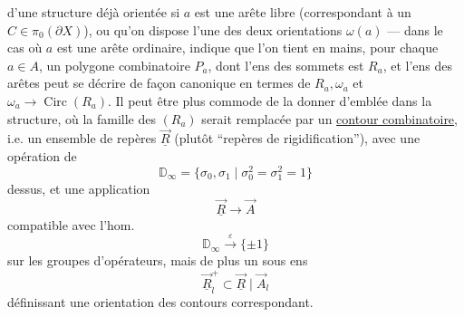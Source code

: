 d'une structure déjà orientée si $a$ est une arête libre
(correspondant à un $C\in\pi_0(\partial X)$), ou qu'on dispose
 l'une des deux orientations $\omega(a)$ ---
dans le cas où $a$ est une arête ordinaire, indique que l'on tient en mains,
pour chaque $a\in A$, un polygone combinatoire $P_a$, dont l'ens des sommets
est $R_a$, et l'ens des arêtes peut se décrire 
de façon canonique en termes de $R_a,\omega_a$ et
$\omega_a\longrightarrow\operatorname{Circ}(R_a)$.
Il peut être plus commode de la donner d'emblée dans la structure,
où la famille des $(R_a)$ serait remplacée par un
\uline{contour combinatoire}, i.e. un ensemble de repères
$\vec{\underline R}$ (plutôt ``repères de rigidification''), avec une opération de
\[
 \mathbb D_\infty=\{\sigma_0,\sigma_1\mid\sigma_0^2=\sigma_1^2=1\}
\]
dessus, et une application
\[
 \vec{\underline R}\longrightarrow\vec A
\]
compatible avec l'hom.
\[
 \mathbb D_\infty\xrightarrow{\varepsilon}\{\pm1\}
\]
sur les groupes d'opérateurs, mais de plus un sous ens
\[
 \vec{\underline R}_l^+\subset\vec{\underline R}\mid\vec A_l
\]
définissant une orientation des contours correspondant.

